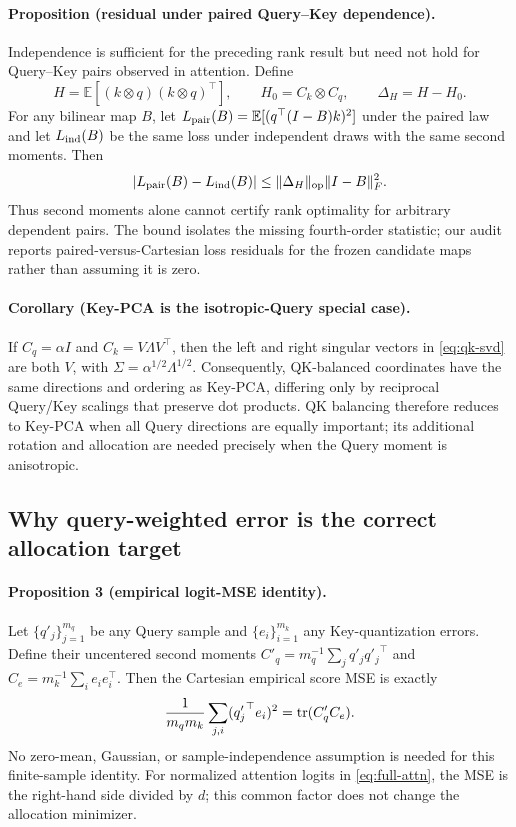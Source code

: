 \paragraph{Proposition (residual under paired Query--Key dependence).}
Independence is sufficient for the preceding rank result but need not hold
for Query--Key pairs observed in attention.  Define
\begin{equation}
 H=\mathbb E[(k\otimes q)(k\otimes q)^\top],\qquad
 H_0=C_k\otimes C_q,\qquad
 \Delta_H=H-H_0 .
\end{equation}
For any bilinear map $B$, let
$L_{\rm pair}(B)=\mathbb E[(q^\top(I-B)k)^2]$ under the paired law and let
$L_{\rm ind}(B)$ be the same loss under independent draws with the same
second moments.  Then
\begin{equation}
 |L_{\rm pair}(B)-L_{\rm ind}(B)|
 \le \|\Delta_H\|_{\mathrm{op}}\|I-B\|_F^2.
 \label{eq:paired-qk-dependence}
\end{equation}
Thus second moments alone cannot certify rank optimality for arbitrary
dependent pairs.  The bound isolates the missing fourth-order statistic;
our audit reports paired-versus-Cartesian loss residuals for the frozen
candidate maps rather than assuming it is zero.

\paragraph{Corollary (Key-PCA is the isotropic-Query special case).}
If $C_q=\alpha I$ and
$C_k=V\Lambda V^\top$, then the left and right singular vectors in
\cref{eq:qk-svd} are both $V$, with
$\Sigma=\alpha^{1/2}\Lambda^{1/2}$.
Consequently, QK-balanced coordinates have the same directions and ordering
as Key-PCA, differing only by reciprocal Query/Key scalings that preserve
dot products.  QK balancing therefore reduces to Key-PCA when all Query
directions are equally important; its additional rotation and allocation
are needed precisely when the Query moment is anisotropic.

\subsection{Why query-weighted error is the correct allocation target}

\paragraph{Proposition 3 (empirical logit-MSE identity).}
Let $\{q'_j\}_{j=1}^{m_q}$ be any Query sample and
$\{e_i\}_{i=1}^{m_k}$ any Key-quantization errors.
Define their uncentered second moments
$C'_q=m_q^{-1}\sum_jq'_j{q'_j}^\top$ and
$C_e=m_k^{-1}\sum_ie_ie_i^\top$.
Then the Cartesian empirical score MSE is exactly
\begin{equation}
 \frac{1}{m_qm_k}\sum_{j,i}({q'_j}^\top e_i)^2
 =\operatorname{tr}(C'_qC_e).
 \label{eq:trace-qmse}
\end{equation}
No zero-mean, Gaussian, or sample-independence assumption is needed for this
finite-sample identity.
For normalized attention logits in \cref{eq:full-attn}, the MSE is the
right-hand side divided by $d$; this common factor does not change the
allocation minimizer.

